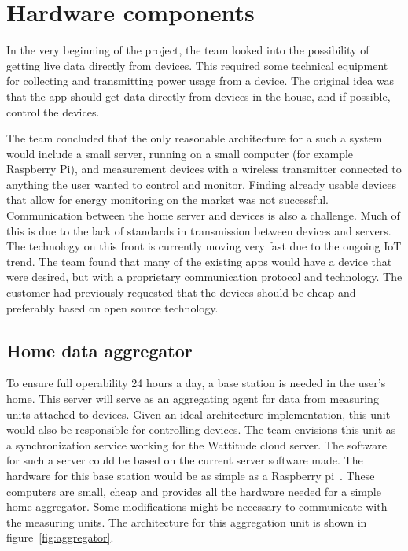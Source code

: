 \section{Hardware components}
\label{sec:hardwareComponents}
In the very beginning of the project, the team looked into the possibility of getting live data directly from devices. This required some technical equipment for collecting and transmitting power usage from a device. The original idea was that the app should get data directly from devices in the house, and if possible, control the devices.

The team concluded that the only reasonable architecture for a such a system would include a small server, running on a small computer (for example Raspberry Pi), and measurement devices with a wireless transmitter connected to anything the user wanted to control and monitor. Finding already usable devices that allow for energy monitoring on the market was not successful. Communication between the home server and devices is also a challenge. Much of this is due to the lack of standards in transmission between devices and servers. The technology on this front is currently moving very fast due to the ongoing \gls{IoT} trend. The team found that many of the existing apps would have a device that were desired, but with a proprietary communication protocol and technology. The customer had previously requested that the devices should be cheap and preferably based on open source technology.

\subsection{Home data aggregator}
To ensure full operability 24 hours a day, a base station is needed in the user's home. This server will serve as an aggregating agent for data from measuring units attached to devices. Given an ideal architecture implementation, this unit would also be responsible for controlling devices. The team envisions this unit as a synchronization service working for the Wattitude cloud server. The software for such a server could be based on the current server software made. The hardware for this base station would be as simple as a Raspberry pi~\cite{pi}. These computers are small, cheap and provides all the hardware needed for a simple home aggregator. Some modifications might be necessary to communicate with the measuring units. The architecture for this aggregation unit is shown in figure~\ref{fig:aggregator}.


